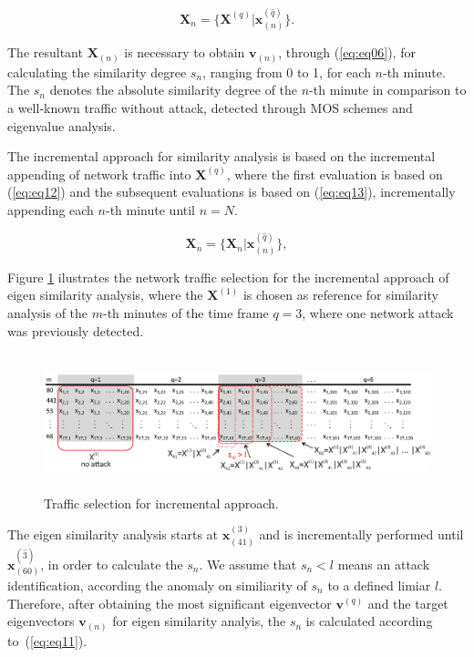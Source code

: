 \documentclass[review]{elsarticle}
\begin{document}
\begin{equation}\label{eq:eq12}
\boldsymbol{X}_{n} = \{\boldsymbol{X}^{(q)} | \boldsymbol{x}^{(\hat{q})}_{(n)}\}.
\end{equation}

The resultant $\boldsymbol{X}_{(n)}$ is necessary to obtain $\boldsymbol{v}_{(n)}$, through (\ref{eq:eq06}), for calculating the similarity degree $s_n$, ranging from 0 to 1, for each $n$-th minute. The $s_n$ denotes the absolute similarity degree of the $n$-th minute in comparison to a well-known traffic without attack, detected through MOS schemes and eigenvalue analysis.

The incremental approach for similarity analysis is based on the incremental appending of network traffic into $\boldsymbol{X}^{(q)}$, where the first evaluation is based on (\ref{eq:eq12}) and the subsequent evaluations is based on (\ref{eq:eq13}), incrementally appending each $n$-th minute until $n=N$.

\begin{equation}\label{eq:eq13}
\boldsymbol{X}_{n} = \{\boldsymbol{X}_{n} | \boldsymbol{x}^{(\hat{q})}_{(n)}\},
\end{equation}

Figure \ref{fig:fig8} ilustrates the network traffic selection for the incremental approach of eigen similarity analysis, where the $\boldsymbol{X}^{(1)}$ is chosen as reference for similarity analysis of the $m$-th minutes of the time frame $q=3$, where one network attack was previously detected. 

\begin{figure}[h!]
     \includegraphics[height=4cm, width=12.4cm]{results/figures/incremental.eps}
     \caption{Traffic selection for incremental approach.}
     \label{fig:fig8}
\end{figure}

The eigen similarity analysis starts at $\boldsymbol{x}^{(3)}_{(41)}$ and is incrementally performed until $\boldsymbol{x}^{(\hat{3})}_{(60)}$, in order to calculate the $s_n$. We assume that $s_n < l$ means an attack identification, according the anomaly on similiarity of $s_n$ to a defined limiar $l$. Therefore, after obtaining the most significant eigenvector $\boldsymbol{v}^{(q)}$ and the target eigenvectors $\boldsymbol{v}_{(n)}$ for eigen similarity analyis, the $s_n$ is calculated according to~(\ref{eq:eq11}).
\end{document}

